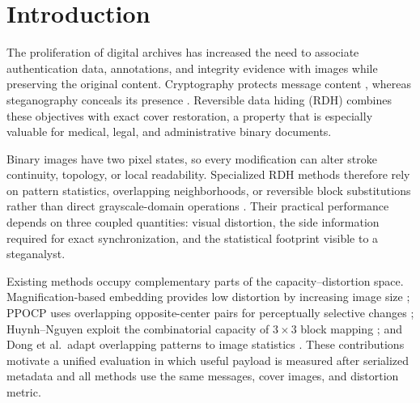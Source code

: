 \documentclass[a4paper,fleqn]{cas-dc}
\newcommand{\RevisionAddBegin}{\begingroup}
\newcommand{\RevisionAddEnd}{\endgroup}
\newcommand{\RevisionAddBegin}{\begingroup\color{revisionblue}}
\newcommand{\RevisionAddEnd}{\endgroup}
\begin{document}
\maketitle

\section{Introduction}
\label{sec:introduction}

The proliferation of digital archives has increased the need to associate
authentication data, annotations, and integrity evidence with images while
preserving the original content. Cryptography protects message content
\RevisionAddBegin
\cite{Rivest1978RSA}, whereas steganography conceals its presence
\cite{Johnson2001InformationHiding}. Reversible data hiding (RDH) combines these objectives with
\RevisionAddEnd
exact cover restoration, a property that is especially valuable for medical,
legal, and administrative binary documents.

\RevisionAddBegin
Binary images have two pixel states, so every modification can alter
\RevisionAddEnd
stroke continuity, topology, or local readability. Specialized RDH methods
therefore rely on pattern statistics, overlapping neighborhoods, or reversible
block substitutions rather than direct grayscale-domain operations
\cite{Chhajed2023BlockDiagonal,Huynh2025BlockMapping,Yang2023Large,
Ren2023Sliding,Dong2020Adaptive,Zhang2019Magnification,Yin2020PPOCP,
Yin2020SymmetricFlipping,Ren2019Encrypted,Feng2015Secure,Xuan2008RunLength}. Their practical performance depends
on three coupled quantities: visual distortion, the side information required
for exact synchronization, and the statistical footprint visible to a
steganalyst.

\RevisionAddBegin
Existing methods occupy complementary parts of the capacity--distortion space.
Magnification-based embedding provides low distortion by increasing image size
\cite{Zhang2019Magnification}; PPOCP
\RevisionAddEnd
uses overlapping opposite-center pairs for perceptually selective changes
\cite{Yin2020PPOCP}; Huynh--Nguyen exploit the combinatorial capacity of
$3\times3$ block mapping \cite{Huynh2025BlockMapping}; and Dong et al.\ adapt
overlapping patterns to image statistics \cite{Dong2020Adaptive}. These
contributions motivate a unified evaluation in
which useful payload is measured after serialized metadata and all methods use
\RevisionAddBegin
the same messages, cover images, and distortion metric.
\RevisionAddEnd
\end{document}
